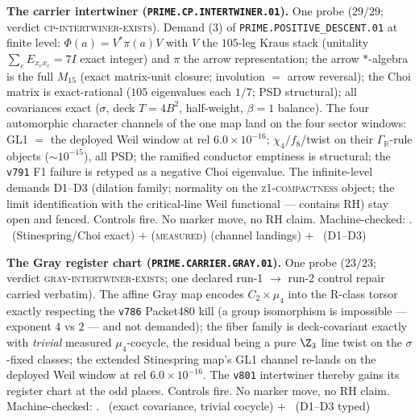 \par\smallskip\noindent\textbf{The carrier intertwiner
(\texttt{PRIME.CP.INTERTWINER.01}).}
One probe ($29/29$; verdict \textsc{cp-intertwiner-exists}).
Demand (3) of \texttt{PRIME.POSITIVE\_DESCENT.01} at finite level:
$\Phi(a)=V^{*}\pi(a)V$ with $V$ the $105$-leg Kraus stack
(unitality $\sum_e E_{x_ex_e}=7I$ exact integer) and $\pi$ the arrow
representation; the arrow $*$-algebra is the full $M_{15}$ (exact
matrix-unit closure; involution $=$ arrow reversal); the Choi matrix
is exact-rational ($105$ eigenvalues each $1/7$; PSD structural);
all covariances exact ($\sigma$, deck $T=4B^2$, half-weight,
$\beta=1$ balance).  The four automorphic character channels of the
one map land on the four sector windows: GL1 $=$ the deployed Weil
window at rel $6.0\times10^{-16}$; $\chi_4/f_8$/twist on their
$\Gamma_{\mathbb R}$-rule objects (${\sim}10^{-15}$), all PSD; the
ramified conductor emptiness is structural; the \texttt{v791} F1
failure is retyped as a negative Choi eigenvalue.  The
infinite-level demands D1--D3 (dilation family; normality on the
\textsc{z1-compactness} object; the limit identification with the
critical-line Weil functional --- contains RH) stay open and
fenced.  Controls fire.  No marker move, no RH claim.
Machine-checked: .
\mE\ (Stinespring/Choi exact) $+$ (\textsc{measured}) (channel
landings) $+$ \mO\ (D1--D3)
\par\smallskip


\par\smallskip\noindent\textbf{The Gray register chart
(\texttt{PRIME.CARRIER.GRAY.01}).}
One probe ($23/23$; verdict \textsc{gray-intertwiner-exists}; one
declared run-1 $\to$ run-2 control repair carried verbatim).  The
affine Gray map encodes $C_2\times\mu_4$ into the R-class torsor
exactly respecting the \texttt{v786} Packet480 kill (a group
isomorphism is impossible --- exponent $4$ vs $2$ --- and not
demanded); the fiber family is deck-covariant exactly with
\emph{trivial} measured $\mu_4$-cocycle, the residual being a pure
$\Z_3$ line twist on the $\sigma$-fixed classes; the extended
Stinespring map's GL1 channel re-lands on the deployed Weil window
at rel $6.0\times10^{-16}$.  The \texttt{v801} intertwiner thereby
gains its register chart at the odd places.  Controls fire.  No
marker move, no RH claim.
Machine-checked: .
\mE\ (exact covariance, trivial cocycle) $+$ \mO\ (D1--D3 typed)
\par\smallskip


